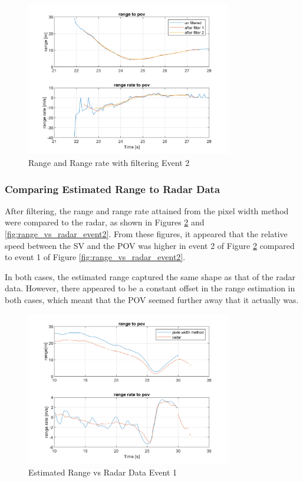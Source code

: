 \begin{figure}[H]
    \centering
    \includegraphics[width=0.8\textwidth]{FiguresMat/filter_compare_116147345.png}
    \caption{Range and Range rate with filtering Event 2}
    \label{fig:range_filtering_event2}
\end{figure}

\subsubsection{Comparing Estimated Range to Radar Data}
After filtering, the range and range rate attained from the pixel width method were compared to the radar, as shown in Figures \ref{fig:range_vs_radar_event1} and \ref{fig:range_vs_radar_event2}. From these figures, it appeared that the relative speed between the SV and the POV was higher in event 2 of Figure \ref{fig:range_vs_radar_event1} compared to event 1 of Figure \ref{fig:range_vs_radar_event2}. 

In both cases, the estimated range captured the same shape as that of the radar data. However, there appeared to be a constant offset in the range estimation in both cases, which meant that the POV seemed further away that it actually was.

\begin{figure}[H]
    \centering
    \includegraphics[width=0.8\textwidth]{FiguresMat/radar_compare_10794257.png}
    \caption{Estimated Range vs Radar Data Event 1}
    \label{fig:range_vs_radar_event1}
\end{figure}

